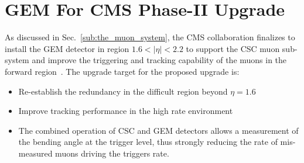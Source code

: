 \section{GEM For CMS Phase-II Upgrade} %
\label{sec:gem_for_cms}
As discussed in Sec.~\ref{sub:the_muon_system},  the CMS collaboration finalizes to install the GEM detector in region $1.6 < |\eta| < 2.2$ to support the CSC muon sub-system and improve the triggering and tracking capability of the muons in the forward region~\cite{Colaleo:2021453}. 
The upgrade target for the proposed upgrade is:
    \begin{itemize}
        \item Re-establish the redundancy in the difficult region beyond $\eta = 1.6 $
        \item Improve tracking performance in the high rate environment
        \item The combined operation of CSC and GEM detectors allows a measurement of the bending angle at the trigger level, thus strongly reducing the rate of mis-measured muons driving the triggers rate.
    \end{itemize}
